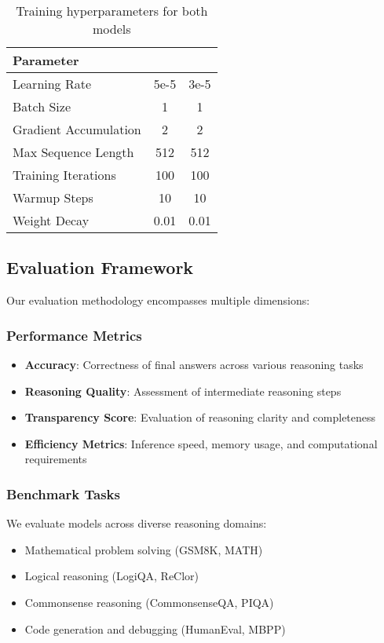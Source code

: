 \begin{table}[h]
\centering
\begin{tabular}{lcc}
\toprule
Parameter & \supra{} & \zennano{} \\
\midrule
Learning Rate & 5e-5 & 3e-5 \\
Batch Size & 1 & 1 \\
Gradient Accumulation & 2 & 2 \\
Max Sequence Length & 512 & 512 \\
Training Iterations & 100 & 100 \\
Warmup Steps & 10 & 10 \\
Weight Decay & 0.01 & 0.01 \\
\bottomrule
\end{tabular}
\caption{Training hyperparameters for both models}
\label{tab:hyperparameters}
\end{table}

\subsection{Evaluation Framework}

Our evaluation methodology encompasses multiple dimensions:

\subsubsection{Performance Metrics}
\begin{itemize}
    \item \textbf{Accuracy}: Correctness of final answers across various reasoning tasks
    \item \textbf{Reasoning Quality}: Assessment of intermediate reasoning steps
    \item \textbf{Transparency Score}: Evaluation of reasoning clarity and completeness
    \item \textbf{Efficiency Metrics}: Inference speed, memory usage, and computational requirements
\end{itemize}

\subsubsection{Benchmark Tasks}
We evaluate models across diverse reasoning domains:
\begin{itemize}
    \item Mathematical problem solving (GSM8K, MATH)
    \item Logical reasoning (LogiQA, ReClor)
    \item Commonsense reasoning (CommonsenseQA, PIQA)
    \item Code generation and debugging (HumanEval, MBPP)
\end{itemize}

